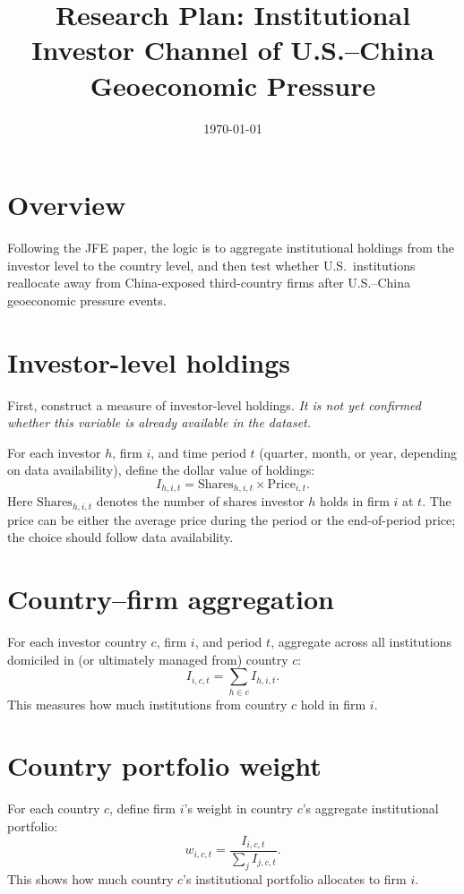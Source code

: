 \documentclass[11pt]{article}
\title{Research Plan: Institutional Investor Channel of U.S.--China Geoeconomic Pressure}
\author{}
\date{\today}
\begin{document}
\maketitle

\section*{Overview}

Following the JFE paper, the logic is to aggregate institutional holdings from the investor level to the country level, and then test whether U.S.\ institutions reallocate away from China-exposed third-country firms after U.S.--China geoeconomic pressure events.

\section{Investor-level holdings}

First, construct a measure of investor-level holdings. \emph{It is not yet confirmed whether this variable is already available in the dataset.}

For each investor $h$, firm $i$, and time period $t$ (quarter, month, or year, depending on data availability), define the dollar value of holdings:
\[
I_{h,i,t} = \text{Shares}_{h,i,t} \times \text{Price}_{i,t}.
\]
Here $\text{Shares}_{h,i,t}$ denotes the number of shares investor $h$ holds in firm $i$ at $t$. The price can be either the average price during the period or the end-of-period price; the choice should follow data availability.

\section{Country--firm aggregation}

For each investor country $c$, firm $i$, and period $t$, aggregate across all institutions domiciled in (or ultimately managed from) country $c$:
\[
I_{i,c,t} = \sum_{h \in c} I_{h,i,t}.
\]
This measures how much institutions from country $c$ hold in firm $i$.

\section{Country portfolio weight}

For each country $c$, define firm $i$'s weight in country $c$'s aggregate institutional portfolio:
\[
w_{i,c,t} = \frac{I_{i,c,t}}{\sum_j I_{j,c,t}}.
\]
This shows how much country $c$'s institutional portfolio allocates to firm $i$.
\end{document}
